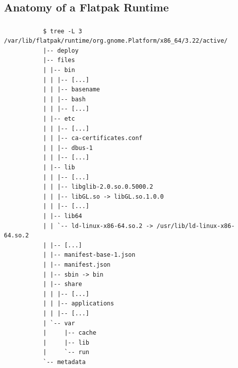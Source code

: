 \subsection{Anatomy of a Flatpak Runtime}
\begin{frame}[fragile]
  \frametitle{\insertsubsection}

    \begin{tiny}
\begin{verbatim}
           $ tree -L 3 /var/lib/flatpak/runtime/org.gnome.Platform/x86_64/3.22/active/
           |-- deploy
           |-- files
           | |-- bin
           | | |-- [...]
           | | |-- basename
           | | |-- bash
           | | |-- [...]
           | |-- etc
           | | |-- [...]
           | | |-- ca-certificates.conf
           | | |-- dbus-1
           | | |-- [...]
           | |-- lib
           | | |-- [...]
           | | |-- libglib-2.0.so.0.5000.2
           | | |-- libGL.so -> libGL.so.1.0.0
           | | |-- [...]
           | |-- lib64
           | | `-- ld-linux-x86-64.so.2 -> /usr/lib/ld-linux-x86-64.so.2
           | |-- [...]
           | |-- manifest-base-1.json
           | |-- manifest.json
           | |-- sbin -> bin
           | |-- share
           | | |-- [...]
           | | |-- applications
           | | |-- [...]
           | `-- var
           |     |-- cache
           |     |-- lib
           |     `-- run
           `-- metadata
\end{verbatim}
    \end{tiny}
\end{frame}

